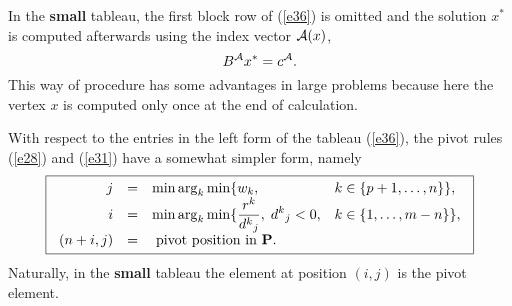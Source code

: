 In the {\bf small} tableau, the first block row of (\ref{e36}) is omitted and
the solution $x^*$ is computed afterwards using the index vector $\A(x)$,
\[
B^{\A}x^* = c^{\A}.
\]
This way of procedure has some advantages in large problems because here the
vertex $x$ is computed only once at the end of calculation.
\par
With respect to the entries in the left form of the tableau (\ref{e36}), the
pivot rules (\ref{e28}) and (\ref{e31}) have a somewhat simpler form,
namely
%
\begin{equation} \label{e36a}
\fbox{$
\ba{.}{rcll}
j &=& \min \arg_k \min \{w_k, & k \in \{p+1, \ldots, n\}\},\\
i &=& \dis \min \arg_k \min \{\frac{r^k}
{d^k{}_j}, \; d^k{}_j < 0, & k \in \{1, \ldots, m -n \}\},\\
(n+i,j) &=& \; \mbox{pivot position in {\bf P}}.
\ea{.}
$}
\end{equation}
Naturally, in the {\bf small} tableau the element at position $(i,j)$ is the
pivot element.
